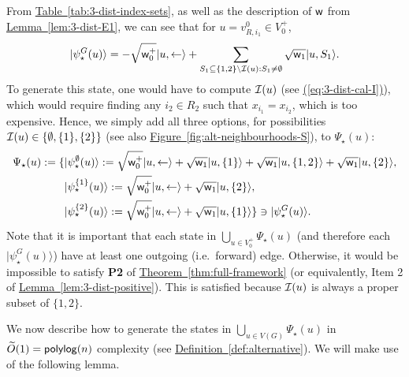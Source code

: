 \documentclass{theoretics}
\newcommand{\eq}[1]{\hyperref[eq:#1]{(\ref*{eq:#1})}}
\newcommand{\thm}[1]{\hyperref[thm:#1]{Theorem~\ref*{thm:#1}}}
\newcommand{\lem}[1]{\hyperref[lem:#1]{Lemma~\ref*{lem:#1}}}
\newcommand{\tabl}[1]{\hyperref[tab:#1]{Table~\ref*{tab:#1}}}
\newcommand{\defin}[1]{\hyperref[def:#1]{Definition~\ref*{def:#1}}}
\newcommand{\fig}[1]{\hyperref[fig:#1]{Figure~\ref*{fig:#1}}}
\def\ket#1{{\lvert}#1\rangle}
\renewcommand{\>}{\rangle}
\newcommand{\<}{\langle}
\renewcommand{\(}{\left(}
\renewcommand{\)}{\right)}
\def\w{{\sf w}}
\begin{document}
From \tabl{3-dist-index-sets}, as well as the description of $\w$ from \lem{3-dist-E1}, we can see that for $u=v_{R,i_1}^0\in V_0^+$, 
$$\ket{\psi^G_\star(u)}=-\sqrt{\w_0^+}\ket{u,\leftarrow}+\sum_{S_1\subseteq\{1,2\}\setminus{\cal I}(u):S_1\neq\emptyset}\sqrt{\w_1}\ket{u,S_1}.$$
To generate this state, one would have to compute ${\cal I}(u)$ (see \eq{3-dist-cal-I}), which would require finding any $i_2\in R_2$ such that $x_{i_1}=x_{i_2}$, which is too expensive. Hence, we simply add all three options, for possibilities ${\cal I}(u)\in\{\emptyset,\{1\},\{2\}\}$ (see also \fig{alt-neighbourhoods-S}),
to $\Psi_\star(u)$:
\begin{equation}
\begin{split}
\Psi_\star(u) := \{&\ket{\psi_\star^{\emptyset}(u)}:=\sqrt{\w_0^+}\ket{u,\leftarrow}+\sqrt{\w_1}\ket{u,\{1\}}+\sqrt{\w_1}\ket{u,\{1,2\}}+\sqrt{\w_1}\ket{u,\{2\}},\\
&\ket{\psi_\star^{\{1\}}(u)}:=\sqrt{\w_0^+}\ket{u,\leftarrow}+\sqrt{\w_1}\ket{u,\{2\}},\\
&\ket{\psi_\star^{\{2\}}(u)}:=\sqrt{\w_0^+}\ket{u,\leftarrow}+\sqrt{\w_1}\ket{u,\{1\}}
\} \ni \ket{\psi_\star^G(u)}.
\end{split}\label{eq:3-dist-stars}
\end{equation}
Note that it is important that each state in $\bigcup_{u\in V_0^+}\Psi_\star(u)$ (and therefore each $\ket{\psi_\star^{G}(u)}$) have at least one outgoing (i.e.~forward) edge. Otherwise, it would be impossible to satisfy \textbf{P2} of \thm{full-framework} (or equivalently, Item 2 of \lem{3-dist-positive}). This is satisfied because ${\cal I}(u)$ is always a proper subset of $\{1,2\}$.

We now describe how to generate the states in $\bigcup_{u\in V(G)}\Psi_\star(u)$ in $\widetilde{O}(1)={\sf polylog}(n)$ complexity (see \defin{alternative}). We will make use of the following lemma.
\end{document}
